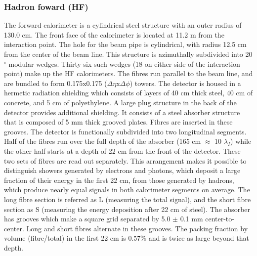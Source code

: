\subsubsection{Hadron foward (HF)}
The forward calorimeter is a cylindrical steel structure with an outer radius of 130.0 cm. The front face of the calorimeter is located at 11.2 m from the interaction point. The hole for the beam pipe is cylindrical, with radius 12.5 cm from the center of the beam line. This structure is azimuthally subdivided into 20$^\circ$ modular wedges. Thirty-six such wedges (18 on either side of the interaction point) make up the HF calorimeters. The fibres run parallel to the beam line, and are bundled to form 0.175x0.175 ($\Delta \eta$x$\Delta \phi$) towers. The detector is housed in a hermetic radiation shielding which consists of layers of 40 cm thick steel, 40 cm of concrete, and 5 cm of polyethylene. A large plug structure in the back of the detector provides additional shielding. It consists of a steel absorber structure that is composed of 5 mm thick grooved plates. Fibres are inserted in these grooves. The detector is functionally subdivided into two longitudinal segments. Half of the fibres run over the full depth of the absorber (165 cm $\approx$ 10 $\lambda_{I}$) while the other half starts at a depth of 22 cm from the front of the detector. These two sets of fibres are read out separately. This arrangement makes it possible to distinguish showers generated by electrons and photons, which deposit a large fraction of their energy in the first 22 cm, from those generated by hadrons, which produce nearly equal signals in both calorimeter segments on average. The long fibre section is referred as L (measuring the total signal), and the short fibre section as S (measuring the energy deposition after 22 cm of steel). The absorber has grooves which make a square grid separated by 5.0 $\pm$ 0.1 mm center-to-center. Long and short fibres alternate in these grooves. The packing fraction by volume (fibre/total) in the first 22 cm is $0.57\%$ and is twice as large beyond that depth.

